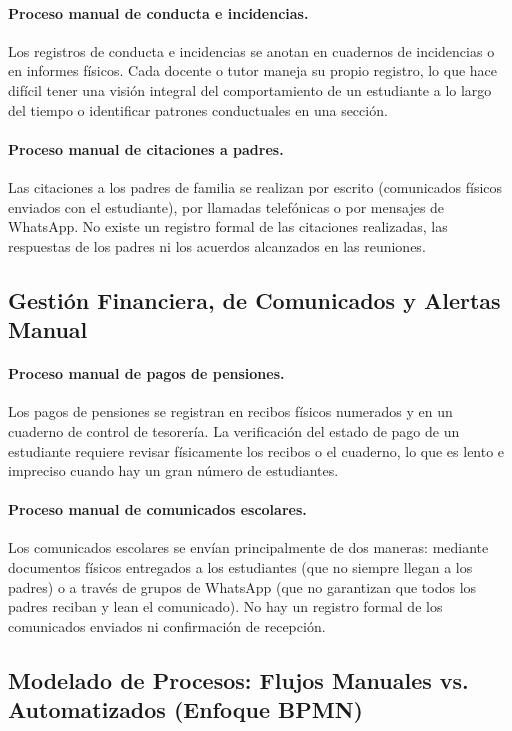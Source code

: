 \documentclass[12pt,a4paper,oneside]{report}
\begin{document}
\paragraph{Proceso manual de conducta e incidencias.} Los registros de conducta e incidencias se anotan en cuadernos de incidencias o en informes físicos. Cada docente o tutor maneja su propio registro, lo que hace difícil tener una visión integral del comportamiento de un estudiante a lo largo del tiempo o identificar patrones conductuales en una sección.

\paragraph{Proceso manual de citaciones a padres.} Las citaciones a los padres de familia se realizan por escrito (comunicados físicos enviados con el estudiante), por llamadas telefónicas o por mensajes de WhatsApp. No existe un registro formal de las citaciones realizadas, las respuestas de los padres ni los acuerdos alcanzados en las reuniones.

\subsection{Gestión Financiera, de Comunicados y Alertas Manual}

\paragraph{Proceso manual de pagos de pensiones.} Los pagos de pensiones se registran en recibos físicos numerados y en un cuaderno de control de tesorería. La verificación del estado de pago de un estudiante requiere revisar físicamente los recibos o el cuaderno, lo que es lento e impreciso cuando hay un gran número de estudiantes.

\paragraph{Proceso manual de comunicados escolares.} Los comunicados escolares se envían principalmente de dos maneras: mediante documentos físicos entregados a los estudiantes (que no siempre llegan a los padres) o a través de grupos de WhatsApp (que no garantizan que todos los padres reciban y lean el comunicado). No hay un registro formal de los comunicados enviados ni confirmación de recepción.

\subsection{Modelado de Procesos: Flujos Manuales vs. Automatizados (Enfoque BPMN)}
\end{document}
